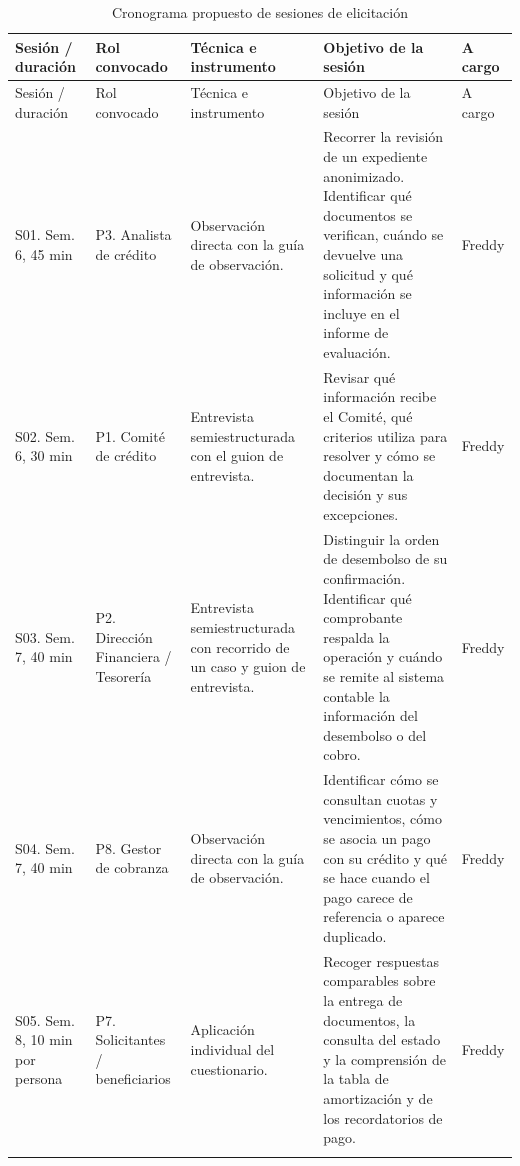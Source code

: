 \documentclass[11pt,a4paper]{article}
\begin{document}
\begingroup
\small
\setlength{\tabcolsep}{4pt}
\begin{longtable}{@{}L{.12}L{.19}L{.20}L{.30}L{.10}@{}}
\caption{Cronograma propuesto de sesiones de elicitación}
\label{tab:sesiones}\\
\toprule
Sesión / duración & Rol convocado & Técnica e instrumento
& Objetivo de la sesión & A cargo \\
\midrule
\endfirsthead

\toprule
Sesión / duración & Rol convocado & Técnica e instrumento
& Objetivo de la sesión & A cargo \\
\midrule
\endhead

\bottomrule
\endfoot

S01. Sem. 6, 45 min
& P3. Analista de crédito
& Observación directa con la guía de observación.
& Recorrer la revisión de un expediente anonimizado. Identificar
qué documentos se verifican, cuándo se devuelve una solicitud
y qué información se incluye en el informe de evaluación.
& Freddy \\
\addlinespace

S02. Sem. 6, 30 min
& P1. Comité de crédito
& Entrevista semiestructurada con el guion de entrevista.
& Revisar qué información recibe el Comité, qué criterios utiliza
para resolver y cómo se documentan la decisión y sus excepciones.
& Freddy \\
\addlinespace

S03. Sem. 7, 40 min
& P2. Dirección Financiera / Tesorería
& Entrevista semiestructurada con recorrido de un caso y guion
de entrevista.
& Distinguir la orden de desembolso de su confirmación. Identificar
qué comprobante respalda la operación y cuándo se remite al
sistema contable la información del desembolso o del cobro.
& Freddy \\
\addlinespace

S04. Sem. 7, 40 min
& P8. Gestor de cobranza
& Observación directa con la guía de observación.
& Identificar cómo se consultan cuotas y vencimientos, cómo se
asocia un pago con su crédito y qué se hace cuando el pago carece
de referencia o aparece duplicado.
& Freddy \\
\addlinespace

S05. Sem. 8, 10 min por persona
& P7. Solicitantes / beneficiarios
& Aplicación individual del cuestionario.
& Recoger respuestas comparables sobre la entrega de documentos,
la consulta del estado y la comprensión de la tabla de
amortización y de los recordatorios de pago.
& Freddy \\
\addlinespace


\end{longtable}
\end{document}
